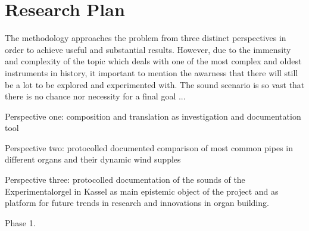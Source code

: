 \chapter{Research Plan}

The methodology approaches the problem from three distinct perspectives in order to achieve useful and substantial results. However, due to the immensity and complexity of the topic which deals with one of the most complex and oldest instruments in history, it important to mention the awarness that there will still be a lot to be explored and experimented with. The sound scenario is so vast that there is no chance nor necessity for a final goal ...


 
Perspective one: composition and translation as investigation and documentation tool 


Perspective two: protocolled documented comparison of most common pipes in different organs and their dynamic  wind supples 


Perspective three: protocolled documentation of the sounds of the Experimentalorgel in Kassel as main epistemic object of the project and as platform for future trends in research and innovations in organ building. 


Phase 1. 

